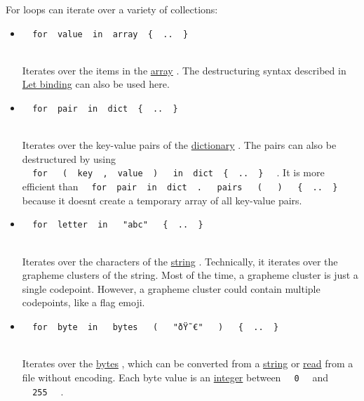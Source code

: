 For loops can iterate over a variety of collections:

\begin{itemize}
\item
  \texttt{\ }{\texttt{\ for\ }}\texttt{\ value\ }{\texttt{\ in\ }}\texttt{\ array\ }{\texttt{\ \{\ }}\texttt{\ ..\ }{\texttt{\ \}\ }}\texttt{\ }\strut \\
  Iterates over the items in the
  \href{/docs/reference/foundations/array/}{array} . The destructuring
  syntax described in \href{/docs/reference/scripting/\#bindings}{Let
  binding} can also be used here.
\item
  \texttt{\ }{\texttt{\ for\ }}\texttt{\ pair\ }{\texttt{\ in\ }}\texttt{\ dict\ }{\texttt{\ \{\ }}\texttt{\ ..\ }{\texttt{\ \}\ }}\texttt{\ }\strut \\
  Iterates over the key-value pairs of the
  \href{/docs/reference/foundations/dictionary/}{dictionary} . The pairs
  can also be destructured by using
  \texttt{\ }{\texttt{\ for\ }}\texttt{\ }{\texttt{\ (\ }}\texttt{\ key\ }{\texttt{\ ,\ }}\texttt{\ value\ }{\texttt{\ )\ }}\texttt{\ }{\texttt{\ in\ }}\texttt{\ dict\ }{\texttt{\ \{\ }}\texttt{\ ..\ }{\texttt{\ \}\ }}\texttt{\ }
  . It is more efficient than
  \texttt{\ }{\texttt{\ for\ }}\texttt{\ pair\ }{\texttt{\ in\ }}\texttt{\ dict\ }{\texttt{\ .\ }}\texttt{\ }{\texttt{\ pairs\ }}\texttt{\ }{\texttt{\ (\ }}\texttt{\ }{\texttt{\ )\ }}\texttt{\ }{\texttt{\ \{\ }}\texttt{\ ..\ }{\texttt{\ \}\ }}\texttt{\ }
  because it doesn\textquotesingle t create a temporary array of all
  key-value pairs.
\item
  \texttt{\ }{\texttt{\ for\ }}\texttt{\ letter\ }{\texttt{\ in\ }}\texttt{\ }{\texttt{\ "abc"\ }}\texttt{\ }{\texttt{\ \{\ }}\texttt{\ ..\ }{\texttt{\ \}\ }}\texttt{\ }\strut \\
  Iterates over the characters of the
  \href{/docs/reference/foundations/str/}{string} . Technically, it
  iterates over the grapheme clusters of the string. Most of the time, a
  grapheme cluster is just a single codepoint. However, a grapheme
  cluster could contain multiple codepoints, like a flag emoji.
\item
  \texttt{\ }{\texttt{\ for\ }}\texttt{\ byte\ }{\texttt{\ in\ }}\texttt{\ }{\texttt{\ bytes\ }}\texttt{\ }{\texttt{\ (\ }}\texttt{\ }{\texttt{\ "ðŸ˜€"\ }}\texttt{\ }{\texttt{\ )\ }}\texttt{\ }{\texttt{\ \{\ }}\texttt{\ ..\ }{\texttt{\ \}\ }}\texttt{\ }\strut \\
  Iterates over the \href{/docs/reference/foundations/bytes/}{bytes} ,
  which can be converted from a
  \href{/docs/reference/foundations/str/}{string} or
  \href{/docs/reference/data-loading/read/}{read} from a file without
  encoding. Each byte value is an
  \href{/docs/reference/foundations/int/}{integer} between
  \texttt{\ }{\texttt{\ 0\ }}\texttt{\ } and
  \texttt{\ }{\texttt{\ 255\ }}\texttt{\ } .
\end{itemize}

